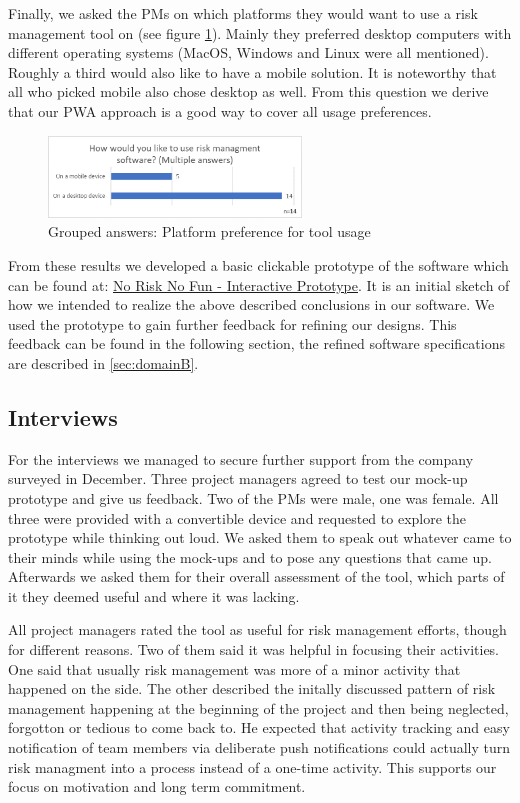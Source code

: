 Finally, we asked the PMs on which platforms they would want to use a risk management tool on (see figure \ref{fig:label26}). Mainly they preferred desktop computers with different operating systems (MacOS, Windows and Linux were all mentioned). Roughly a third would also like to have a mobile solution. It is noteworthy that all who picked mobile also chose desktop as well. From this question we derive that our PWA approach is a good way to cover all usage preferences.

\begin{figure}[H]
	\centering
	\includegraphics[width=0.6\textwidth]{Assets/survey_results/Q7.png}
	\caption{Grouped answers: Platform preference for tool usage}
	\label{fig:label26}
\end{figure}

From these results we developed a basic clickable prototype of the software which can be found at: \underline{\href{https://norisknofun.invisionapp.com/prototype/NoRiskNoFunPreview-ck5aubx9g002w6o01rhyo61z3/play/40faaf12}{No Risk No Fun - Interactive Prototype}}. It is an initial sketch of how we intended to realize the above described conclusions in our software. We used the prototype to gain further feedback for refining our designs. This feedback can be found in the following section, the refined software specifications are described in \ref{sec:domainB}.

\subsection{Interviews}
\label{sec:DomainAb}
For the interviews we managed to secure further support from the company surveyed in December. Three project managers agreed to test our mock-up prototype and give us feedback. Two of the PMs were male, one was female. All three were provided with a convertible device and requested to explore the prototype while thinking out loud. We asked them to speak out whatever came to their minds while using the mock-ups and to pose any questions that came up. Afterwards we asked them for their overall assessment of the tool, which parts of it they deemed useful and where it was lacking.

All project managers rated the tool as useful for risk management efforts, though for different reasons. Two of them said it was helpful in focusing their activities. One said that usually risk management was more of a minor activity that happened on the side. The other described the initally discussed pattern of risk management happening at the beginning of the project and then being neglected, forgotton or tedious to come back to. He expected that activity tracking and easy notification of team members via deliberate push notifications could actually turn risk managment into a process instead of a one-time activity. This supports our focus on motivation and long term commitment.

